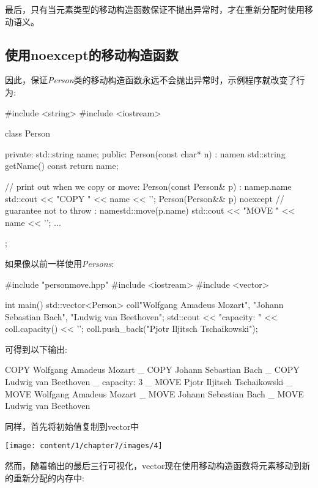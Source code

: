 最后，只有当元素类型的移动构造函数保证不抛出异常时，才在重新分配时使用移动语义。

\subsection{使用noexcept的移动构造函数}

因此，保证\textit{Person}类的移动构造函数永远不会抛出异常时，示例程序就改变了行为:

\begin{cppcode}
#include <string>
#include <iostream>

class Person {
	private:
	std::string name;
	public:
	Person(const char* n)
	: name{n} {
	}
	std::string getName() const {
		return name;
	}

	// print out when we copy or move:
	Person(const Person& p)
	: name{p.name} {
		std::cout << "COPY " << name << '\n';
	}
	Person(Person&& p) noexcept // guarantee not to throw
	: name{std::move(p.name)} {
		std::cout << "MOVE " << name << '\n';
	}
	...
};
\end{cppcode}

如果像以前一样使用\textit{Persons}:

\begin{cppcode}
#include "personmove.hpp"
#include <iostream>
#include <vector>

int main()
{
	std::vector<Person> coll{"Wolfgang Amadeus Mozart",
		"Johann Sebastian Bach",
		"Ludwig van Beethoven"};
	std::cout << "capacity: " << coll.capacity() << '\n';
	coll.push_back("Pjotr Iljitsch Tschaikowski");
}
\end{cppcode}

可得到以下输出:

\begin{shell}
COPY Wolfgang Amadeus Mozart _ 
COPY Johann Sebastian Bach _
COPY Ludwig van Beethoven _
capacity: 3 _
MOVE Pjotr Iljitsch Tschaikowski _
MOVE Wolfgang Amadeus Mozart _
MOVE Johann Sebastian Bach _
MOVE Ludwig van Beethoven
\end{shell}

同样，首先将初始值复制到vector中

\begin{center}
	\texttt{[image: content/1/chapter7/images/4]}
\end{center}

然而，随着输出的最后三行可视化，vector现在使用移动构造函数将元素移动到新的重新分配的内存中:

